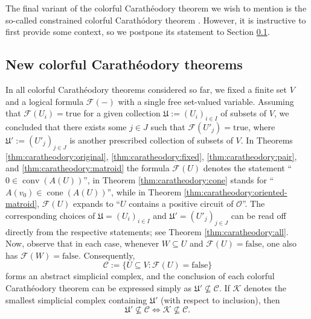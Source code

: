 \documentclass[a4paper,11pt,reqno, english]{amsart}
\theoremstyle{definition}
\theoremstyle{remark}
\DeclareMathOperator{\cone}{\mathrm{cone}}
\DeclareMathOperator{\conv}{\mathrm{conv}}
\begin{document}
\medskip
The final variant of the colorful Carath\'eodory theorem we wish to mention is the so-called constrained colorful Carath\'odory theorem \cite[Thm.\,1.6]{Blagojevic2025}. However, it is instructive to first provide some context, so we postpone its statement to Section \ref{sec:intro-and-main-results:new-generalizations}.

\medskip
\subsection{New colorful Carath\'eodory theorems}\label{sec:intro-and-main-results:new-generalizations}
\medskip

In all colorful Carath\'eodory theorems considered so far, we fixed a finite set $V$ and a logical formula $\mathcal{F}(-)$ with a single free set-valued variable. 
Assuming that $\mathcal{F}(U_i)=\mathrm{true}$ for a given collection $\mathfrak{U}:=(U_i)_{i\in I}$ of subsets of $V$, we concluded that there exists some $j\in J$ such that $\mathcal{F}(U'_j)=\mathrm{true}$, where $\mathfrak{U}':=(U'_j)_{j\in J}$ is another prescribed collection of subsets of $V$. 
In Theorems \ref{thm:caratheodory:original}, \ref{thm:caratheodory:fixed}, \ref{thm:caratheodory:pair}, and \ref{thm:caratheodory:matroid} the formula $\mathcal{F}(U)$ denotes the statement ``$0\in\conv(A(U))$'', in Theorem \ref{thm:caratheodory:cone} stands for ``$A(v_0)\in\cone(A(U))$'', while in Theorem \ref{thm:caratheodory:oriented-matroid}, $\mathcal{F}(U)$ expands to ``$U$ contains a positive circuit of $\mathscr{O}$''.
The corresponding choices of $\mathfrak{U}=(U_i)_{i\in I}$ and $\mathfrak{U}'=(U'_j)_{j\in J}$ can be read off directly from the respective statements; see Theorem \ref{thm:caratheodory:all}.
Now, observe that in each case, whenever $W\subseteq U$ and $\mathcal{F}(U)=\mathrm{false}$, one also has $\mathcal{F}(W)=\mathrm{false}$.
Consequently,
\[\mathscr{C}:=\{U\subseteq V:\mathcal{F}(U)=\mathrm{false}\}\]
forms an abstract simplicial complex, and the conclusion of each colorful Carath\'eodory theorem can be expressed simply as $\mathfrak{U}'\nsubseteq\mathscr{C}$.
If $\mathscr{K}$ denotes the smallest simplicial complex containing $\mathfrak{U}'$ (with respect to inclusion), then 
\[\mathfrak{U}'\nsubseteq\mathscr{C}\iff\mathscr{K}\nsubseteq\mathscr{C}.\]
\end{document}

